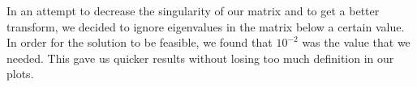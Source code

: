

In an attempt to decrease the singularity of our matrix and to get a better transform, we decided to ignore eigenvalues in the matrix below a certain value. In order for the solution to be feasible, we found that $10^{-2}$ was the value that we needed. This gave us quicker results without losing too much definition in our plots.